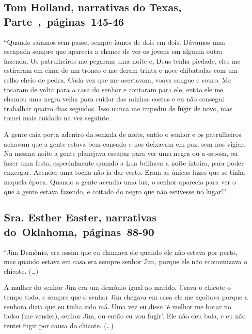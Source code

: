 \subsection{Tom Holland, narrativas do Texas, Parte~,~páginas~145-46}
\label{ref148}

``Quando saíamos sem passe, sempre íamos de dois em dois. Dávamos uma
escapada sempre que aparecia a chance de ver os jovens em alguma outra
fazenda. Os patrulheiros me pegaram uma noite e, Deus tenha piedade,
eles me estiraram em cima de um tronco e me deram trinta e nove
chibatadas com um relho cheio de pedra. Cada vez que me acertavam, voava
sangue e couro. Me tocaram de volta para a casa do senhor e contaram
para ele, então ele me chamou uma negra velha para cuidar das minhas
costas e eu não consegui trabalhar quatro dias seguidos. Isso nunca me
impediu de fugir de novo, mas tomei mais cuidado na vez seguinte.

A gente caía porta adentro da senzala de noite, então o senhor e os
patrulheiros achavam que a gente estava bem cansado e nos deixavam em
paz, sem nos vigiar. Na mesma noite a gente planejava escapar para ver
uma negra ou a esposa, ou fazer uma festa, especialmente quando a Lua
brilhava a noite inteira, para poder enxergar. Acender uma tocha não ia
dar certo. Eram as únicas luzes que se tinha naquela época. Quando a
gente acendia uma luz, o senhor aparecia para ver o que a gente estava
fazendo, e coitado do negro que não estivesse no lugar!''.

\subsection{Sra. Esther Easter, narrativas do~Oklahoma,~páginas~88-90} \label{ref78}

``Jim Demônio, era assim que eu chamava ele quando ele não estava por
perto, mas quando estava em casa era sempre senhor Jim, porque ele não
economizava o chicote. (\ldots{})

A mulher do senhor Jim era um demônio igual ao marido. Usava o chicote o
tempo todo, e sempre que o senhor Jim chegava em casa ele me açoitava
porque a senhora dizia que eu tinha sido má. Uma vez eu disse `é melhor
me botar no bolso (me vender), senhor Jim, ou então eu vou fugir'. Ele
não deu bola, e eu não tentei fugir por causa do chicote. (\ldots{})

